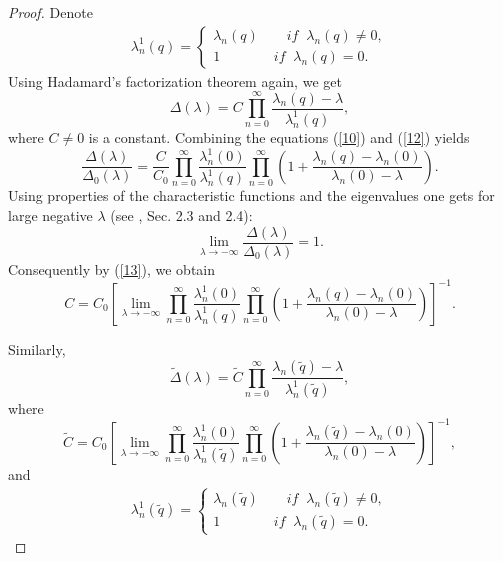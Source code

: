 \documentclass[reqno,11pt,centertags]{amsart}
\numberwithin{equation}{section}
\theoremstyle{definition}
\begin{document}
\begin{proof}
Denote
\begin{align}\label{11}
  \lambda_{n}^{1}(q)=\begin{cases}
            \lambda_{n}(q)\qquad if\;\; \lambda_{n}(q)\neq0,\\
           1\qquad\quad\;\;\; if\;\;\lambda_{n}(q)=0.
       \end{cases}
\end{align}
Using Hadamard's factorization theorem again, we get
\begin{equation}\label{12}
  \Delta(\lambda)=C\prod_{n=0}^{\infty}\frac{\lambda_{n}(q)-\lambda}{\lambda_{n}^{1}(q)},
\end{equation}
where $C\neq0$ is a constant. Combining the equations (\ref{10}) and (\ref{12}) yields
\begin{equation}\label{13}
  \frac{\Delta(\lambda)}{\Delta_{0}(\lambda)}=\frac{C}{C_{0}}\prod_{n=0}^{\infty}\frac{\lambda_{n}^{1}(0)}{\lambda_{n}^{1}(q)}
  \prod_{n=0}^{\infty}\left(1+\frac{\lambda_{n}(q)-\lambda_{n}(0)}{\lambda_{n}(0)-\lambda}\right).
\end{equation}
Using properties of the characteristic functions and the eigenvalues one gets for large negative $\lambda$ (see \cite{Yur}, Sec. 2.3 and 2.4):
\begin{equation}
  \lim_{\lambda\rightarrow-\infty}\frac{\Delta(\lambda)}{\Delta_{0}(\lambda)}=1.\nonumber
\end{equation}
Consequently by (\ref{13}), we obtain
\begin{equation}\label{14}
C=C_{0}\left[\lim_{\lambda\rightarrow-\infty}\prod_{n=0}^{\infty}\frac{\lambda_{n}^{1}(0)}{\lambda_{n}^{1}(q)}
  \prod_{n=0}^{\infty}\left(1+\frac{\lambda_{n}(q)-\lambda_{n}(0)}{\lambda_{n}(0)-\lambda}\right)\right]^{-1}.
\end{equation}

Similarly,
\begin{equation}\label{15}
\widetilde{\Delta}(\lambda)=\widetilde{C}\prod_{n=0}^{\infty}\frac{\lambda_{n}(\widetilde{q})-\lambda}{\lambda_{n}^{1}(\widetilde{q})},
\end{equation}
where
\begin{equation}\label{16}
\widetilde{C}=C_{0}\left[\lim_{\lambda\rightarrow-\infty}\prod_{n=0}^{\infty}\frac{\lambda_{n}^{1}(0)}{\lambda_{n}^{1}(\widetilde{q})}
  \prod_{n=0}^{\infty}\left(1+\frac{\lambda_{n}(\widetilde{q})-\lambda_{n}(0)}{\lambda_{n}(0)-\lambda}\right)\right]^{-1},
\end{equation}
and
\begin{align}\label{16-1}
  \lambda_{n}^{1}(\widetilde{q})=\begin{cases}
            \lambda_{n}(\widetilde{q})\qquad if\;\; \lambda_{n}(\widetilde{q})\neq0,\\
           1\qquad\quad\;\;\; if\;\;\lambda_{n}(\widetilde{q})=0.
       \end{cases}
\end{align}


\end{proof}
\end{document}
